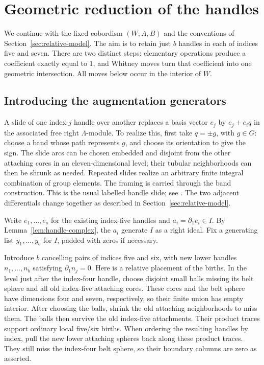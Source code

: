 \section{Geometric reduction of the handles}
\label{sec:cancellation}

We continue with the fixed cobordism $(W;A,B)$ and the conventions of
Section~\ref{sec:relative-model}.  The aim is to retain just $b$ handles
in each of indices five and seven.  There are two distinct steps:
elementary operations produce a coefficient exactly equal to $1$, and
Whitney moves turn that coefficient into one geometric intersection.
All moves below occur in the interior of $W$.

\subsection{Introducing the augmentation generators}

A slide of one index-$j$ handle over another replaces a basis vector
$e_j$ by $e_j+e_iq$ in the associated free right $\Lambda$-module.
To realize this, first take $q=\pm g$, with $g\in G$: choose a band
whose path represents $g$, and choose its orientation to give the sign.
The slide arcs can be chosen embedded and disjoint from the other
attaching cores in an eleven-dimensional level; their tubular
neighborhoods can then be shrunk as needed.  Repeated slides
realize an arbitrary finite integral combination of group elements.
The framing is carried through the band construction.  This is the
usual labelled handle slide; see \cite[proof of Theorem~4.2,
pp.~9--10]{Morgan2020}.  The two adjacent differentials change together
as described in Section~\ref{sec:relative-model}.

Write $e_1,\ldots,e_s$ for the existing index-five handles and
$a_i=\partial_1e_i\in I$.  By Lemma~\ref{lem:handle-complex}, the $a_i$
generate $I$ as a right ideal.  Fix a generating list
$y_1,\ldots,y_b$ for $I$, padded with zeros if necessary.

Introduce $b$ cancelling pairs of indices five and six, with new lower
handles $n_1,\ldots,n_b$ satisfying $\partial_1n_j=0$.
Here is a relative placement of the births.  In the level just after
the index-four handle, choose disjoint small balls missing its belt
sphere and all old index-five attaching cores.  These cores and the
belt sphere have dimensions four and seven, respectively, so their
finite union has empty interior.  After choosing the balls, shrink the
old attaching neighborhoods to miss them.  The balls then survive the
old index-five attachments.  Their product traces support ordinary
local five/six births.  When ordering the resulting handles by index,
pull the new lower attaching spheres back along these product traces.
They still miss the index-four belt sphere, so their boundary columns
are zero as asserted.

